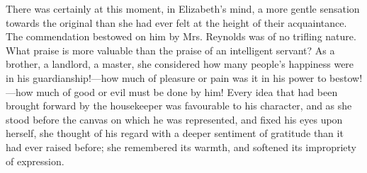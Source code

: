 




There was certainly at this moment, in Elizabeth's mind, a more gentle sensation towards the original than she had ever felt at the height of their acquaintance. The commendation bestowed on him by Mrs. Reynolds was of no trifling nature. What praise is more valuable than the praise of an intelligent servant? As a brother, a landlord, a master, she considered how many people's happiness were in his guardianship!—how much of pleasure or pain was it in his power to bestow!—how much of good or evil must be done by him! Every idea that had been brought forward by the housekeeper was favourable to his character, and as she stood before the canvas on which he was represented, and fixed his eyes upon herself, she thought of his regard with a deeper sentiment of gratitude than it had ever raised before; she remembered its warmth, and softened its impropriety of expression.


